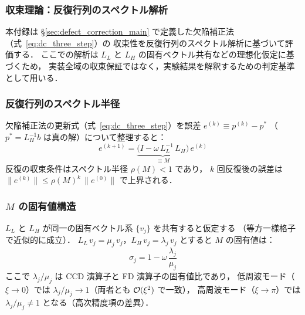 %

\subsubsection{収束理論：反復行列のスペクトル解析}
\label{app:dc_convergence_theory}

本付録は §\ref{sec:defect_correction_main} で定義した欠陥補正法（式~\eqref{eq:dc_three_step}）の
収束性を反復行列のスペクトル解析に基づいて評価する．
ここでの解析は $L_L$ と $L_H$ の固有ベクトル共有などの理想化仮定に基づくため，
実装全域の収束保証ではなく，実験結果を解釈するための判定基準として用いる．

\subsubsection*{反復行列のスペクトル半径}

欠陥補正法の更新式（式~\eqref{eq:dc_three_step}）を誤差 $e^{(k)} \equiv p^{(k)} - p^*$
（$p^* = L_H^{-1} b$ は真の解）について整理すると：
\begin{equation}
  e^{(k+1)} = \underbrace{\bigl(I - \omega\,L_L^{-1}\,L_H\bigr)}_{\displaystyle \equiv M}\,e^{(k)}
  \label{eq:dc_iteration_matrix}
\end{equation}
反復の収束条件はスペクトル半径 $\rho(M) < 1$ であり，
$k$ 回反復後の誤差は $\|e^{(k)}\| \leq \rho(M)^k\,\|e^{(0)}\|$ で上界される．

\subsubsection*{\texorpdfstring{$M$ の固有値構造}{M の固有値構造}}

$L_L$ と $L_H$ が同一の固有ベクトル系 $\{v_j\}$ を共有すると仮定する
（等方一様格子で近似的に成立）．
$L_L\,v_j = \mu_j\,v_j$，$L_H\,v_j = \lambda_j\,v_j$ とすると
$M$ の固有値は：
\begin{equation}
  \sigma_j = 1 - \omega\,\frac{\lambda_j}{\mu_j}
  \label{eq:dc_eigenvalue}
\end{equation}
ここで $\lambda_j / \mu_j$ は CCD 演算子と FD 演算子の固有値比であり，
低周波モード（$\xi \to 0$）では $\lambda_j / \mu_j \to 1$（両者とも $\mathcal{O}(\xi^2)$ で一致），
高周波モード（$\xi \to \pi$）では $\lambda_j / \mu_j \neq 1$ となる（高次精度項の差異）．

